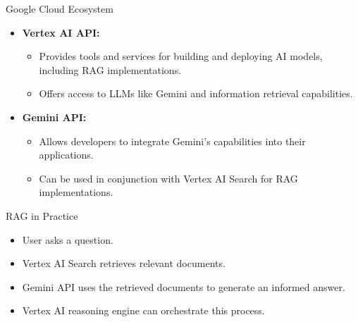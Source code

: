 \begin{frame}{Google Cloud Ecosystem}
    \begin{itemize}
        \item \textbf{Vertex AI API:}
        \begin{itemize}
            \item Provides tools and services for building and deploying AI models, including RAG implementations.
            \item Offers access to LLMs like Gemini and information retrieval capabilities.
        \end{itemize}
        \item \textbf{Gemini API:}
        \begin{itemize}
            \item Allows developers to integrate Gemini's capabilities into their applications.
            \item Can be used in conjunction with Vertex AI Search for RAG implementations.
        \end{itemize}
    \end{itemize}
\end{frame}

\begin{frame}{RAG in Practice}
    \begin{itemize}
        \item User asks a question.
        \item Vertex AI Search retrieves relevant documents.
        \item Gemini API uses the retrieved documents to generate an informed answer.
        \item Vertex AI reasoning engine can orchestrate this process.
    \end{itemize}
\end{frame}


